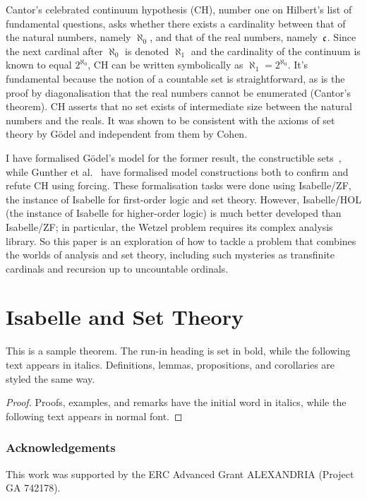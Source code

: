 \documentclass[runningheads]{llncs}
\begin{document}
Cantor's celebrated continuum hypothesis (CH), number one on Hilbert's list of fundamental questions, asks whether there exists a cardinality between that of the natural numbers, namely $\aleph_0$, and that of the real numbers, namely~$\frak{c}$.
Since the next cardinal after $\aleph_0$ is denoted $\aleph_1$ and the cardinality of the continuum is known to equal $2^{\aleph_0}$,  CH can be written symbolically as $\aleph_1 = 2^{\aleph_0}$.
It's fundamental because the notion of a countable set is straightforward, as is the proof by diagonalisation that the real numbers cannot be enumerated (Cantor's theorem).
CH asserts that no set exists of intermediate size between the natural numbers and the reals.
It was shown to be consistent with the axioms of set theory by Gödel and independent from them by Cohen.

I have formalised Gödel's model for the former result, the constructible sets~\cite{paulson-consistency}, while
Gunther et al.\ \cite{Independence_CH-AFP} have formalised model constructions both to confirm and refute CH using forcing.
These formalisation tasks were done using Isabelle/ZF, the instance of Isabelle for first-order logic and set theory.
However, Isabelle/HOL (the instance of Isabelle for higher-order logic) is much better developed than Isabelle/ZF;
in particular, the Wetzel problem requires its complex analysis library. So this paper is an exploration of how to tackle a problem that combines the worlds of analysis and set theory, including such mysteries as transfinite cardinals and recursion up to uncountable ordinals.


\section{Isabelle and Set Theory}



\newpage


\begin{theorem}
This is a sample theorem. The run-in heading is set in bold, while
the following text appears in italics. Definitions, lemmas,
propositions, and corollaries are styled the same way.
\end{theorem}
%
%
\begin{proof}
Proofs, examples, and remarks have the initial word in italics,
while the following text appears in normal font.
\end{proof}


\subsubsection{Acknowledgements} 
This work was supported by the ERC Advanced Grant ALEXANDRIA (Project GA 742178). 



\end{document}
